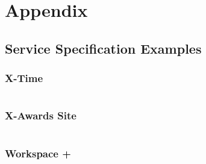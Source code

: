 \documentclass{cshonours}
\begin{document}
\printbibliography[title=References]

\pagebreak
\section{Appendix}
\subsection{Service Specification Examples}
\label{dslexamples}

\subsubsection{X-Time}
\label{dslgem}
\inputminted[fontfamily=fi4]{ruby}{appendices/x-time.rb}

\subsubsection{X-Awards Site}
\inputminted[fontfamily=fi4]{ruby}{appendices/x-awards-site.rb}

\subsubsection{Workspace +}
\inputminted[fontfamily=fi4]{ruby}{appendices/workspace.rb}
\end{document}
